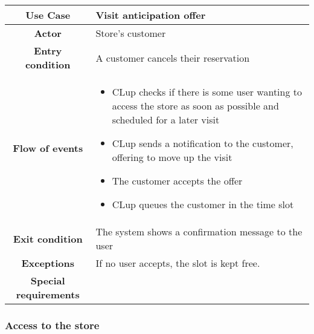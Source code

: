 \documentclass[../../main.tex]{subfiles}
\begin{document}
      \begin{table}[H]
        \centering
          \begin{tabular}{c m{}}
          \hline
          \textbf{Use Case} & Visit anticipation offer\\ \hline
          \textbf{Actor} & Store's customer\\ \hline
          \textbf{Entry condition} & A customer cancels their reservation\\  \hline
          \textbf{Flow of events} & \begin{itemize}
                                      \item CLup checks if there is some user wanting to access the store as soon as possible and scheduled for a later visit
                                      \item CLup sends a notification to the customer, offering to move up the visit
                                      \item The customer accepts the offer
                                      \item CLup queues the customer in the time slot
                                    \end{itemize}\\ \hline
          \textbf{Exit condition} & The system shows a confirmation message to the user \\ \hline
          \textbf{Exceptions} & If no user accepts, the slot is kept free. \\ \hline
          \textbf{Special requirements} &\\ \hline
          \end{tabular}
      \end{table}

      \subsubsection{Access to the store}
\end{document}
